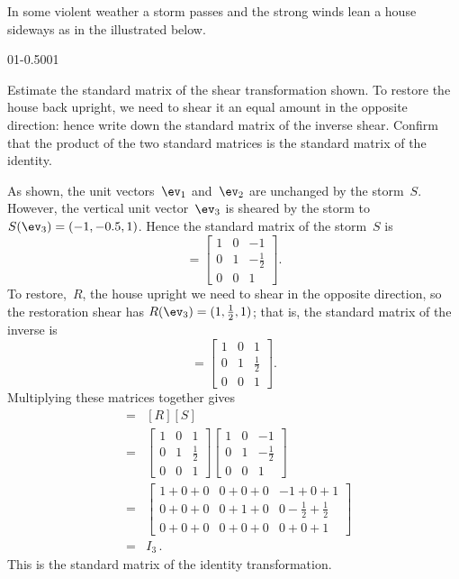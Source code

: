 \begin{example} \label{eg:stormLT}
In some violent weather a storm passes and the strong winds lean a house sideways as in the  illustrated below.
\begin{center}\def\unithousesize{small}
01{-0.5}001
\end{center}
Estimate the standard matrix of the shear transformation shown.
To restore the house back upright, we need to shear it an equal amount in the opposite direction: hence write down the standard matrix of the inverse shear.
Confirm that the product of the two standard matrices is the standard matrix of the identity.
\begin{solution} 
As shown, the unit vectors~\(\ev_1\) and~\(\ev_2\) are unchanged by the storm~\(S\).  
However, the vertical unit vector~\(\ev_3\) is sheared by the storm to \(S(\ev_3)=(-1,-0.5,1)\).
Hence the standard matrix of the storm~\(S\) is
\begin{equation*}
[S]=\begin{bmatrix} 1&0&-1\\0&1&-\tfrac12\\0&0&1 \end{bmatrix}.
\end{equation*}
To restore,~\(R\), the house upright we need to shear in the opposite direction, so the restoration shear has \(R(\ev_3)=(1,\tfrac12,1)\); that is, the standard matrix of the inverse is
\begin{equation*}
[R]=\begin{bmatrix} 1&0&1\\0&1&\tfrac12\\0&0&1 \end{bmatrix}.
\end{equation*}
Multiplying these matrices together gives
\begin{eqnarray*}
[R\circ S]&=&[R][S]
\\&=&\begin{bmatrix} 1&0&1\\0&1&\tfrac12\\0&0&1 \end{bmatrix}
\begin{bmatrix} 1&0&-1\\0&1&-\tfrac12\\0&0&1 \end{bmatrix}
\\&=&\begin{bmatrix} 1+0+0&0+0+0&-1+0+1\\
0+0+0&0+1+0&0-\tfrac12+\tfrac12\\
0+0+0&0+0+0&0+0+1 \end{bmatrix}
\\&=&I_3\,.
\end{eqnarray*}
This is the standard matrix of the identity transformation.
\end{solution}
\end{example}



